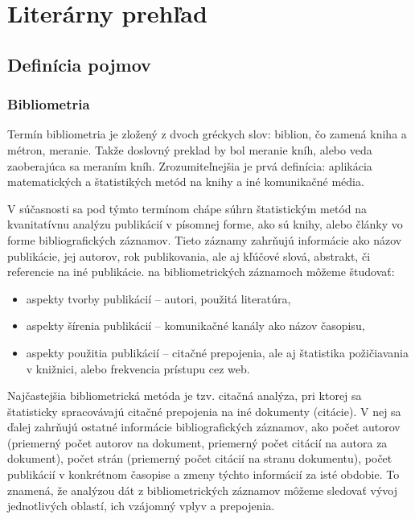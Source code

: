 \chapter{Literárny prehľad}
\setcounter{page}{1}

\section{Definícia pojmov}

\subsection{Bibliometria}

Termín bibliometria je zložený z dvoch gréckych slov: biblion, čo zamená kniha a
métron, meranie.  Takže doslovný preklad by bol meranie kníh, alebo veda
zaoberajúca sa meraním kníh.  Zrozumiteľnejšia je prvá definícia: aplikácia
matematických a štatistikých metód na knihy a iné komunikačné
média. \citet{Pritchard1969}

V súčasnosti sa pod týmto termínom chápe súhrn štatistickým metód na
kvanitatívnu analýzu publikácií v písomnej forme, ako sú knihy, alebo články vo
forme bibliografických záznamov.  Tieto záznamy zahrňujú informácie ako názov
publikácie, jej autorov, rok publikovania, ale aj kľúčové slová, abstrakt, či
referencie na iné publikácie.  na bibliometrických záznamoch môžeme študovať:

\begin{itemize}
\item aspekty tvorby publikácií -- autori, použitá literatúra,
\item aspekty šírenia publikácií -- komunikačné kanály ako názov časopisu,
\item aspekty použitia publikácií -- citačné prepojenia, ale aj štatistika
  požičiavania v knižnici, alebo frekvencia prístupu cez web.  \citep{Ondrisova2011}
\end{itemize}

Najčastejšia bibliometrická metóda je tzv.  citačná analýza, pri ktorej sa
štatisticky spracovávajú citačné prepojenia na iné dokumenty (citácie).  V nej
sa ďalej zahrňujú ostatné informácie bibliografických záznamov, ako počet
autorov (priemerný počet autorov na dokument, priemerný počet citácií na autora
za dokument), počet strán (priemerný počet citácií na stranu dokumentu), počet
publikácií v konkrétnom časopise a zmeny týchto informácií za isté obdobie.  To
znamená, že analýzou dát z bibliometrických záznamov môžeme sledovať vývoj
jednotlivých oblastí, ich vzájomný vplyv a prepojenia.

